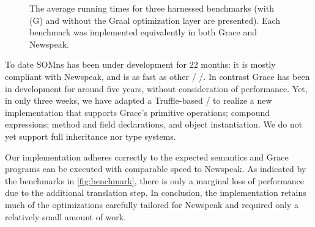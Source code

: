 \begin{figure}
    \centering
    \makebox[\columnwidth][c]{
        \resizebox{\columnwidth}{!}{
            
        }
    }
    \caption{The average running times for three harnessed benchmarks (with (G) and without the Graal optimization layer are presented). Each benchmark was implemented equivalently in both Grace and Newspeak. }
    \label{fig:benchmark}
\end{figure}





To date SOMns has been under development for $22$ months: it is mostly compliant with Newspeak, and is as fast as other \JITing/ \vms/. In contrast Grace has been in development for around five years, without consideration of performance. Yet, in only three weeks, we have adapted a Truffle-based \vm/ to realize a new implementation that supports Grace's primitive operations; compound expressions; method and field declarations, and object instantiation. We do not yet support full inheritance nor type systems.

Our implementation adheres correctly to the expected semantics and Grace programs can be executed with comparable speed to Newspeak. As indicated by the benchmarks in \autoref{fig:benchmark}, there is only a marginal loss of performance due to the additional translation step. In conclusion, the implementation retains much of the optimizations carefully tailored for Newspeak and required only a relatively small amount of work.



